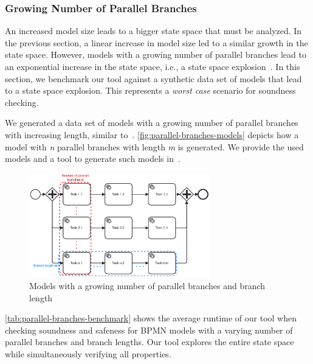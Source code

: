 \documentclass[runningheads]{llncs}
\begin{document}
\subsubsection{Growing Number of Parallel Branches}
An increased model size leads to a bigger state space that must be analyzed.
In the previous section, a linear increase in model size led to a similar growth in the state space.
However, models with a growing number of parallel branches lead to an exponential increase in the state space, i.e., a state space explosion~\cite{clarkeHandbookModelChecking2018}.
In this section, we benchmark our tool against a synthetic data set of models that lead to a state space explosion.
This represents a \textit{worst case} scenario for soundness checking.

We generated a data set of models with a growing number of parallel branches with increasing length, similar to~\cite{corradiniFormalApproachAnalysis2021}.
\autoref{fig:parallel-branches-models} depicts how a model with \textit{n} parallel branches with length \textit{m} is generated.
We provide the used models and a tool to generate such models in~\cite{noauthorgivenBPM2024Artifacts2024}.

\begin{figure}[ht]
	\centering
	\includegraphics[width=0.7\textwidth]{images/parallel-branches}
	\caption{Models with a growing number of parallel branches and branch length}
	\label{fig:parallel-branches-models}
\end{figure}

\autoref{tab:parallel-branches-benchmark} shows the average runtime of our tool when checking soundness and safeness for BPMN models with a varying number of parallel branches and branch lengths.
Our tool explores the entire state space while simultaneously verifying all properties.
\end{document}
